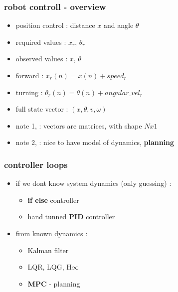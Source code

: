 \documentclass{beamer}
\begin{document}
\begin{frame}
  \frametitle{\bf robot controll - overview}

  \begin{itemize}
    \item position control : distance $x$ and angle $\theta$
    \item required values : $x_r$, $\theta_r$
    \item observed values : $x$, $\theta$ 
    \item forward  : $x_r(n) = x(n) + speed_{r}$
    \item turning  : $\theta_r(n) = \theta(n) + angular\_vel_{r}$
    \item full state vector : $(x, \theta, v, \omega)$
    \item note 1, : vectors are matrices, with shape $N x 1$
    \item note 2, : nice to have model of dynamics, \bf{planning}
  \end{itemize}

\end{frame}






\begin{frame}
  \frametitle{\bf controller loops}


  \begin{itemize}
    \item if we dont know system dynamics (only guessing) : 
      \begin{itemize}
        \item {\bf{if else}} controller
        \item hand tunned {\bf{PID}} controller
      \end{itemize}
    \item from known dynamics :
      \begin{itemize}
        \item Kalman filter
        \item LQR, LQG, H$\infty$
        \item {\bf{MPC}} - planning
      \end{itemize}
  \end{itemize}

\end{frame}
\end{document}
